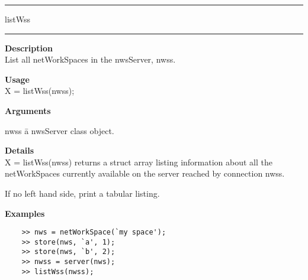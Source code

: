 \rule[0.06in]{6in}{0.01in}
\newline
listWss
\newline
\rule{6in}{0.01in}
\begin{list}{}{}
	\item {\bf Description}\\
	List all netWorkSpaces in the nwsServer, nwss.
	\item {\bf Usage}\\
	X = listWss(nwss);
	\item {\bf Arguments}
		\begin{tabbing}
		nwss \hspace{2.5cm} \= a nwsServer class object.
		\end{tabbing}
	\item {\bf Details}\\
	X = listWss(nwss) returns a struct array listing information
	about all the netWorkSpaces currently available on the server reached by connection nwss.

	If no left hand side, print a tabular listing. 
		
	\item {\bf Examples}
	\begin{verbatim}
	>> nws = netWorkSpace(`my space');
	>> store(nws, `a', 1);
	>> store(nws, `b', 2);
	>> nwss = server(nws);
	>> listWss(nwss);
	\end{verbatim}
\end{list}

